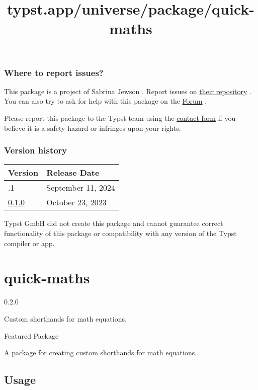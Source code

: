 \subsubsection{Where to report issues?}\label{where-to-report-issues}

This package is a project of Sabrina Jewson . Report issues on
\href{https://github.com/SabrinaJewson/cmarker.typ}{their repository} .
You can also try to ask for help with this package on the
\href{https://forum.typst.app}{Forum} .

Please report this package to the Typst team using the
\href{https://typst.app/contact}{contact form} if you believe it is a
safety hazard or infringes upon your rights.

\label{versions}
\subsubsection{Version history}\label{version-history}

\begin{longtable}[]{@{}ll@{}}
\toprule\noalign{}
Version & Release Date \\
\midrule\noalign{}
\endhead
\bottomrule\noalign{}
\endlastfoot
0.1.1 & September 11, 2024 \\
\href{https://typst.app/universe/package/cmarker/0.1.0/}{0.1.0} &
October 23, 2023 \\
\end{longtable}

Typst GmbH did not create this package and cannot guarantee correct
functionality of this package or compatibility with any version of the
Typst compiler or app.


\title{typst.app/universe/package/quick-maths}

\label{banner}
\section{quick-maths}\label{quick-maths}

{ 0.2.0 }

Custom shorthands for math equations.

{ } Featured Package

\label{readme}
A package for creating custom shorthands for math equations.

\subsection{Usage}\label{usage}

